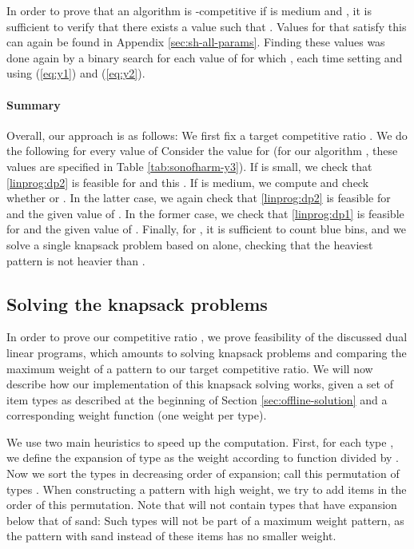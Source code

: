 In order to prove that an \EHarm{} algorithm is -competitive if {  is medium} and ,
it is sufficient to verify that there exists a value
 such that . {Values for  that satisfy this can again be found in Appendix \ref{sec:sh-all-params}. Finding these values was done again }
by a binary search for each value of  for which , each time setting  and using (\ref{eq:y1}) and (\ref{eq:y2}). 


\paragraph{Summary}
{
	Overall, our approach is as follows: We first fix a target competitive ratio . We do the following for every value of  Consider the value for  (for our algorithm \SonofH{}, these values are specified in Table \ref{tab:sonofharm-y3}). If   is small, we check that \ref{linprog:dp2} is feasible for  and this . If   is medium, we compute  and check whether  or . In the latter case, we again check that \ref{linprog:dp2} is feasible for  and the given value of . In the former case, we check that \ref{linprog:dp1} is feasible for  and the given value of .} Finally, for , it is sufficient to count blue bins, and we solve a single knapsack problem based on  alone, {checking that the heaviest pattern is not heavier than .
}



\subsection{Solving the knapsack problems}\label{sec:implementation-knapsack}

In order to prove our competitive ratio , we prove feasibility of the discussed dual linear programs, which amounts to solving knapsack problems and comparing the maximum weight of a pattern to our target competitive ratio. We will now describe how our implementation of this knapsack solving works, given a set of item types as described at the beginning of Section \ref{sec:offline-solution} and a corresponding weight function  (one weight per type).

We use two main heuristics to speed up the computation.
First, for each type , we define the expansion  of type  as the weight according to function  divided by . Now we sort the types in decreasing order of expansion; call this permutation of types .
When constructing a pattern with high weight, we try to add items in the order of this permutation. Note that  will not contain types that have expansion below that of sand: Such types will not be part of a maximum weight pattern, as the pattern with sand instead of these items has no smaller weight.

